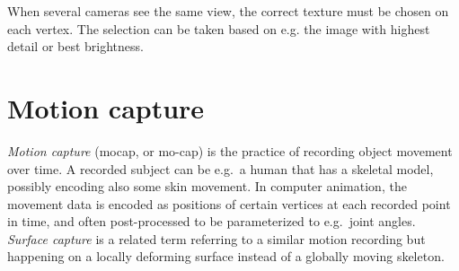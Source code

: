 When several cameras see the same view, the correct texture must be chosen on each vertex.
The selection can be taken based on e.g. the image with highest detail or best brightness.




%
%
%
%
%

\clearpage
\section{Motion capture} \label{sec:motioncapture} %

\emph{Motion capture} (mocap, or mo-cap) is the practice of recording object movement over time.
A recorded subject can be e.g.\ a human that has a skeletal model, possibly encoding also some skin movement.
In computer animation, the movement data is encoded as positions of certain vertices at each recorded point in time, and often post-processed to be parameterized to e.g.\ joint angles.
\emph{Surface capture} is a related term referring to a similar motion recording but happening on a locally deforming surface instead of a globally moving skeleton.

